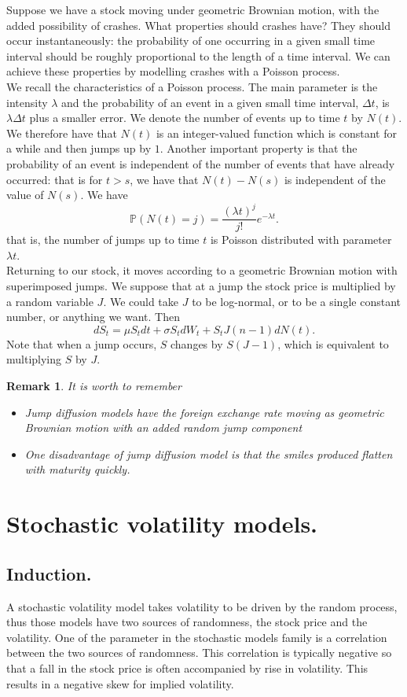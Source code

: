 \documentclass{book}
\newtheorem{remark}{Remark}[section]
\begin{document}
Suppose we have a stock moving under geometric Brownian motion, with the added possibility of crashes. What properties should crashes have? They should occur instantaneously: the probability of one occurring in a given small time interval should be roughly proportional to the length of a time interval. We can achieve these properties by modelling crashes with a Poisson process.\\
We recall the characteristics of a Poisson process. The main parameter is the intensity $\lambda$ and the probability of an event in a given small time interval, $\Delta t$, is $\lambda \Delta t$ plus a smaller error. We denote the number of events up to time $t$ by $N(t).$ We therefore have that $N(t)$ is an integer-valued function which is constant for a while and then jumps up by $1$. Another important property is that the probability of an event is independent of the number of events that have already occurred: that is for $t>s$, we have that $N(t)-N(s)$ is independent of the value of $N(s)$. We have
$$
\mathbb{P}(N(t)=j)=\frac{(\lambda t)^{j}}{j!}e^{-\lambda t}.
$$
that is, the number of jumps up to time $t$ is Poisson distributed with parameter $\lambda t$.\\ Returning to our stock, it moves according to a geometric Brownian motion with superimposed jumps. We suppose that at a jump the stock price is multiplied by a random variable $J$. We could take $J$ to be log-normal, or to be a single constant number, or anything we want. Then
$$
dS_{t}=\mu S_{t}dt+\sigma S_{t}dW_{t}+S_{t}J(n-1)dN(t).
$$
Note that when a jump occurs, $S$ changes by $S(J - 1)$, which is equivalent to multiplying $S$ by $J$.
\begin{remark}
It is worth to remember
\begin{itemize}
\item Jump diffusion models have the foreign exchange rate moving as geometric Brownian motion with an added random jump component
\item One disadvantage of jump diffusion model is that the smiles produced flatten with maturity quickly.
\end{itemize}
\end{remark}

\chapter{Stochastic volatility models.}
\section{Induction.}
A stochastic volatility model takes volatility to be driven by the random process, thus those models have two sources of randomness, the stock price and the volatility. One of the parameter in the stochastic models family is a correlation between the two sources of randomness. This correlation is typically negative so that a fall in the stock price is often accompanied by rise in volatility. This results in a negative skew for implied volatility.
\end{document}
